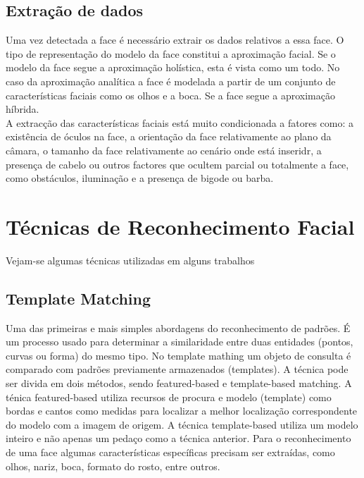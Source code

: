 \documentclass[a4paper,11pt]{article}
\begin{document}
\begin{multicols}{2}
\subsection{Extração de dados}
Uma vez detectada a face é necessário extrair os dados relativos a essa face. O tipo de representação do modelo da face constitui a aproximação facial. Se o modelo da face segue a aproximação holística, esta é vista como um todo. No caso da aproximação analítica a face é modelada a partir de um conjunto de características faciais como os olhos e a boca. Se a face segue a aproximação híbrida.  \\
A extracção das características faciais está muito condicionada a fatores como: a existência de óculos na face, a orientação da face relativamente ao plano da câmara, o tamanho da face relativamente ao cenário onde está inseridr, a presença de cabelo ou outros factores que ocultem parcial ou totalmente a face, como obstáculos, iluminação e a presença de bigode ou barba. \cite{ref:carvalho2004b}

\section{Técnicas de Reconhecimento Facial}
Vejam-se algumas técnicas utilizadas em alguns trabalhos
\subsection{Template Matching}
Uma das primeiras e mais simples abordagens do reconhecimento de padrões. É um processo usado para determinar a similaridade entre duas entidades (pontos, curvas ou forma) do mesmo tipo\cite{ref:silva2006}.
No template mathing um objeto de consulta é comparado com padrões previamente armazenados (templates)\cite{ref:adriano2012}.
A técnica pode ser divida em dois métodos, sendo featured-based e template-based matching.
A ténica featured-based utiliza recursos de procura e modelo (template) como bordas e cantos como medidas para localizar a melhor localização correspondente do modelo com a imagem de origem.  A técnica template-based utiliza um modelo inteiro e não apenas um pedaço como a técnica anterior. Para o reconhecimento de uma face algumas características específicas precisam ser extraídas, como olhos, nariz, boca, formato do rosto, entre outros.\cite{ref:aman2015}


\end{multicols}
\end{document}
